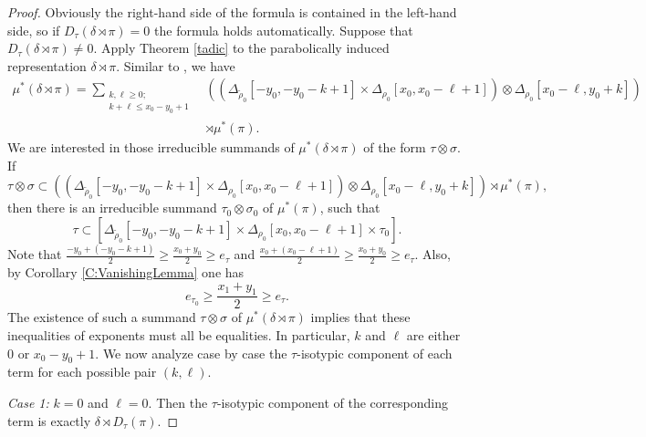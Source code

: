\documentclass[11pt,letterpaper]{amsart}
\theoremstyle{plain}
\numberwithin{theorem}{section}
\numberwithin{equation}{subsection}
\theoremstyle{remark}
\begin{document}
\begin{proof}
Obviously the right-hand side of the formula is contained in the left-hand side, so if $D_\tau\left(\delta\rtimes\pi\right)=0$ the formula holds automatically. Suppose that $D_\tau\left(\delta\rtimes\pi\right)\neq 0$. Apply Theorem \ref{tadic} to the parabolically induced representation $\delta\rtimes\pi$. Similar to \cite[Cor. 2.9]{MR4055180}, we have
\begin{align*}
\mu^*\left(\delta\rtimes\pi\right) = \sum_{\substack{k,\ell\geq 0;\\ k+\ell\leq x_0-y_0+1}} &\left(\left(\Delta_{\widetilde{\rho}_0}\left[-y_0,-y_0-k+1\right]\times\Delta_{\rho_0}\left[x_0,x_0-\ell+1\right]\right)\otimes \Delta_{\rho_0}\left[x_0-\ell, y_0+k\right]\right) \\
&\rtimes \mu^*\left(\pi\right).   
\end{align*}
We are interested in those irreducible summands of $\mu^*\left(\delta\rtimes\pi\right)$ of the form $\tau\otimes \sigma$. If  
\[
    \tau\otimes \sigma \subset \left(\left(\Delta_{\widetilde{\rho}_0}\left[-y_0,-y_0-k+1\right]\times\Delta_{\rho_0}\left[x_0,x_0-\ell+1\right]\right)\otimes \Delta_{\rho_0}\left[x_0-\ell, y_0+k\right]\right) \rtimes \mu^*\left(\pi\right),
\]
then there is an irreducible summand $\tau_0\otimes\sigma_0$ of $\mu^*(\pi)$, such that
\begin{equation*}\label{E:LeibnizSteinbergTadicTermkl}
    \tau\subset \left[\Delta_{\widetilde{\rho}_0}\left[-y_0,-y_0-k+1\right]\times\Delta_{\rho_0}\left[x_0,x_0-\ell+1\right]\times\tau_0\right].
\end{equation*}
Note that $\frac{-y_0 + (-y_0-k+1)}{2} \geq \frac{x_0 + y_0}{2}\geq e_\tau$ and $\frac{x_0 + (x_0-\ell+1)}{2} \geq \frac{x_0 + y_0}{2}\geq e_\tau$. Also, by Corollary \ref{C:VanishingLemma} one has
\[
    e_{\tau_0}\geq \frac{x_1+y_1}{2} \geq e_\tau.
\]
The existence of such a summand $\tau\otimes \sigma$ of $\mu^*(\delta\rtimes\pi)$ implies that these inequalities of exponents must all be equalities. In particular, $k$ and $\ell$ are either $0$ or $x_0-y_0+1$. We now analyze case by case the $\tau$-isotypic component of each term for each possible pair $(k,\ell)$.

\vskip 5pt

\textit{Case 1:} $k=0$ and $\ell=0$. Then the $\tau$-isotypic component of the corresponding term is exactly $\delta\rtimes D_\tau(\pi)$.

\vskip 5pt


\end{proof}
\end{document}
